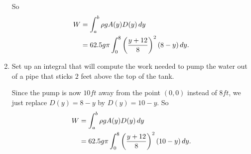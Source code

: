 \documentclass[]{ximera}
\begin{document}
\begin{problem}
\begin{enumerate}
\begin{freeResponse}
		So
			\begin{align*}
			W &= \int_a^b \rho g A(y) D(y) \,d y  \\
			&= 62.5 g \pi \int_0^8 \left( \frac{y+12}{8} \right)^2 (8-y) \,d y.
			\end{align*}
		\end{freeResponse}
		
		
		
		\item  Set up an integral that will compute the work needed to pump the water out of a pipe that sticks $2$ feet above the top of the tank.
		\begin{freeResponse}
		Since the pump is now $10 ft$ away from the point $(0,0)$ instead of $8 ft$, we just replace $D(y) = 8-y$ by $D(y) = 10-y$.  
		So
			\begin{align*}
			W &= \int_a^b \rho g A(y) D(y) \,d y  \\
			&= 62.5 g \pi \int_0^8 \left( \frac{y+12}{8} \right)^2 (10-y) \,d y.
			\end{align*}
		\end{freeResponse}
		
	\end{enumerate}

\end{problem}

\begin{instructorNotes}

\end{instructorNotes}
















	
	
	
	
	
	
	
	
	

	










								
				
				
	
\end{document}
